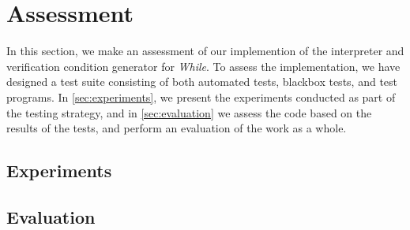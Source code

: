 \section{Assessment}
In this section, we make an assessment of our implemention of the interpreter and verification condition generator for \textit{While}. To assess the implementation, we have designed a test suite consisting of both automated tests, blackbox tests, and test programs.
In \autoref{sec:experiments}, we present the experiments conducted as part of the testing strategy, and in \autoref{sec:evaluation} we assess the code based on the results of the tests, and perform an evaluation of the work as a whole.

\subsection{Experiments}\label{sec:experiments}


\subsection{Evaluation}\label{sec:evaluation}

